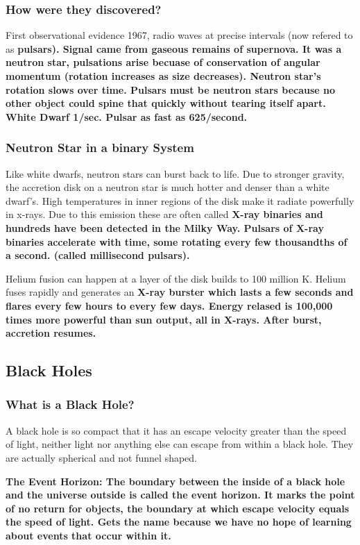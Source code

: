 \subsubsection{How were they discovered?}
First observational evidence 1967, radio waves at precise intervals (now refered to as \bf{pulsars}). Signal came from gaseous remains of supernova. It was a neutron star, pulsations arise becuase of conservation of angular momentum (rotation increases as size decreases). Neutron star's rotation slows over time. \bf{Pulsars} must be neutron stars because no other object could spine that quickly without tearing itself apart. White Dwarf 1/sec. Pulsar as fast as 625/second.

\subsubsection{Neutron Star in a binary System}
Like white dwarfs, neutron stars can burst back to life. Due to stronger gravity, the accretion disk on a neutron star is much hotter and denser than a white dwarf's. High temperatures in inner regions of the disk make it radiate powerfully in x-rays. Due to this emission these are often called \bf{X-ray binaries} and hundreds have been detected in the Milky Way. Pulsars of X-ray binaries accelerate with time, some rotating every few thousandths of a second. (called \bf{millisecond pulsars}).

Helium fusion can happen at a layer of the disk builds to 100 million K. Helium fuses rapidly and generates an \bf{X-ray burster} which lasts a few seconds and flares every few hours to every few days. Energy relased is 100,000 times more powerful than sun output, all in X-rays. After burst, accretion resumes.

\subsection{Black Holes}
\subsubsection{What is a Black Hole?}
A black hole is so compact that it has an escape velocity greater than the speed of light, neither light nor anything else can escape from within a black hole. They are actually spherical and not funnel shaped.

\bf{The Event Horizon}: The boundary between the inside of a black hole and the universe outside is called the event horizon. It marks the point of no return for objects, the boundary at which escape velocity equals the speed of light. Gets the name because we have no hope of learning about events that occur within it.

